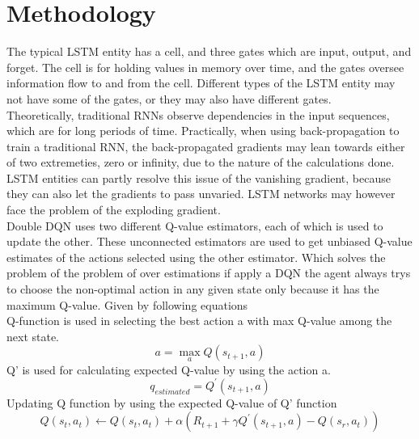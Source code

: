 \documentclass[conference]{IEEEtran}
\begin{document}
\section*{Methodology}

The typical LSTM entity has a cell, and three gates which are input, output, and forget. The cell is for holding values in memory over time, and the gates oversee information flow to and from the cell. Different types of the LSTM entity may not have some of the gates, or they may also have different gates. \\

Theoretically, traditional RNNs observe dependencies in the input sequences, which are for long periods of time. Practically, when using back-propagation to train a traditional RNN, the back-propagated gradients may lean towards either of two extremeties, zero or infinity, due to the nature of the calculations done. LSTM entities can partly resolve this issue of the vanishing gradient, because they can also let the gradients to pass unvaried. LSTM networks may however face the problem of the exploding gradient. \\

Double DQN uses two different Q-value estimators, each of which is used to update the other. These unconnected estimators are used to get unbiased Q-value estimates of the actions selected using the other estimator. Which solves the problem of  the problem of over estimations if apply a DQN the agent always trys to choose the non-optimal action in any given state only because it has the maximum Q-value. Given by following equations \\

Q-function is used in selecting the best action a with max Q-value among the next state.
\begin{equation}
a = \max _ { a } Q \left( s _ { t + 1 } , a \right)
\end{equation}
Q' is used for calculating expected Q-value by using the action a.
\begin{equation}
q _ { e s t i m a t e d } = Q ^ { \prime } \left( s _ { t + 1 } ,  { a } \right)
\end{equation}
Updating Q function by using the expected Q-value of Q' function 
\begin{equation}
Q \left( s _ { t } , a _ { t } \right) \leftarrow Q \left( s _ { t } , a _ { t } \right) + \alpha \left( R _ { t + 1 } + \gamma Q ^ { \prime } \left( s _ { t + 1 } , { a } \right) - Q \left( s _ { r } , a _ { t } \right) \right)
\end{equation}\\
\end{document}
